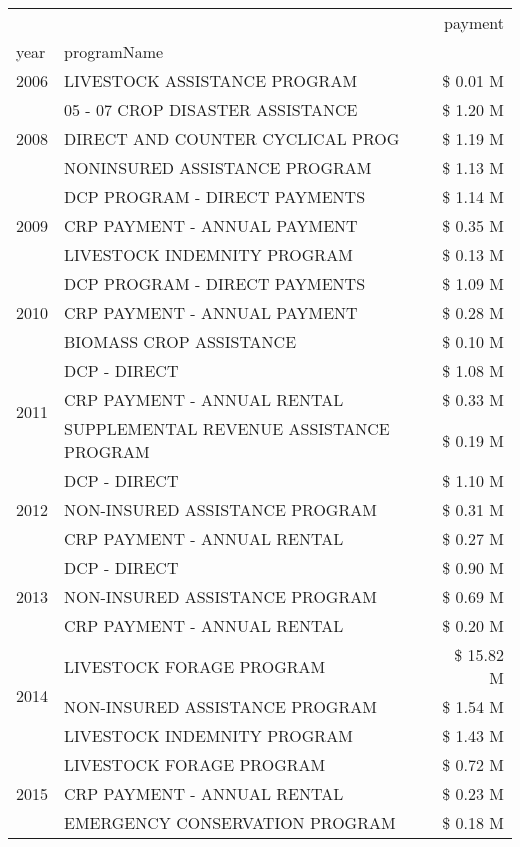 \begin{tabular}{llr}
\toprule
 &  & payment \\
year & programName &  \\
\midrule
2006 & LIVESTOCK ASSISTANCE PROGRAM & \$ 0.01 M \\
\cline{1-3}
\multirow[t]{3}{*}{2008} & 05 - 07 CROP DISASTER ASSISTANCE & \$ 1.20 M \\
 & DIRECT AND COUNTER CYCLICAL PROG & \$ 1.19 M \\
 & NONINSURED ASSISTANCE PROGRAM & \$ 1.13 M \\
\cline{1-3}
\multirow[t]{3}{*}{2009} & DCP PROGRAM - DIRECT PAYMENTS & \$ 1.14 M \\
 & CRP PAYMENT - ANNUAL PAYMENT & \$ 0.35 M \\
 & LIVESTOCK INDEMNITY PROGRAM & \$ 0.13 M \\
\cline{1-3}
\multirow[t]{3}{*}{2010} & DCP PROGRAM - DIRECT PAYMENTS & \$ 1.09 M \\
 & CRP PAYMENT - ANNUAL PAYMENT & \$ 0.28 M \\
 & BIOMASS CROP ASSISTANCE & \$ 0.10 M \\
\cline{1-3}
\multirow[t]{3}{*}{2011} & DCP - DIRECT & \$ 1.08 M \\
 & CRP PAYMENT - ANNUAL RENTAL & \$ 0.33 M \\
 & SUPPLEMENTAL REVENUE ASSISTANCE PROGRAM & \$ 0.19 M \\
\cline{1-3}
\multirow[t]{3}{*}{2012} & DCP - DIRECT & \$ 1.10 M \\
 & NON-INSURED ASSISTANCE PROGRAM & \$ 0.31 M \\
 & CRP PAYMENT - ANNUAL RENTAL & \$ 0.27 M \\
\cline{1-3}
\multirow[t]{3}{*}{2013} & DCP - DIRECT & \$ 0.90 M \\
 & NON-INSURED ASSISTANCE PROGRAM & \$ 0.69 M \\
 & CRP PAYMENT - ANNUAL RENTAL & \$ 0.20 M \\
\cline{1-3}
\multirow[t]{3}{*}{2014} & LIVESTOCK FORAGE PROGRAM & \$ 15.82 M \\
 & NON-INSURED ASSISTANCE PROGRAM & \$ 1.54 M \\
 & LIVESTOCK INDEMNITY PROGRAM & \$ 1.43 M \\
\cline{1-3}
\multirow[t]{3}{*}{2015} & LIVESTOCK FORAGE PROGRAM & \$ 0.72 M \\
 & CRP PAYMENT - ANNUAL RENTAL & \$ 0.23 M \\
 & EMERGENCY CONSERVATION PROGRAM & \$ 0.18 M \\

\end{tabular}
